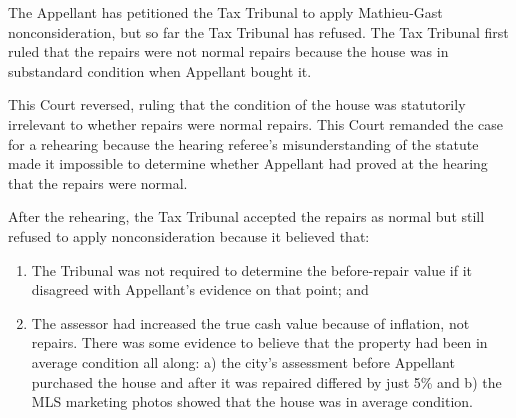 \documentclass[12pt,\documentclassflag]{michiganCourtOfAppealsBrief}
\begin{document}
The Appellant has petitioned the Tax Tribunal to apply Mathieu-Gast nonconsideration, but so far the Tax Tribunal has refused. The Tax Tribunal first ruled that the repairs were not normal repairs because the house was in substandard condition when Appellant bought it.

This Court reversed, ruling that the condition of the house was statutorily irrelevant to whether repairs were normal repairs. This Court remanded the case for a rehearing because the hearing referee's misunderstanding of the statute made it impossible to determine whether Appellant had proved at the hearing that the repairs were normal.

After the rehearing, the Tax Tribunal accepted the repairs as normal but still refused to apply nonconsideration because it believed that:

\begin{enumerate}
\item The Tribunal was not required to determine the before-repair value if it disagreed with Appellant's evidence on that point; and
\item The assessor had increased the true cash value because of inflation, not repairs. There was some evidence to believe that the property had been in average condition all along: a) the city's assessment before Appellant purchased the house and after it was repaired differed by just 5\% and b) the MLS marketing photos showed that the house was in average condition. 
\end{enumerate}





\end{document}
